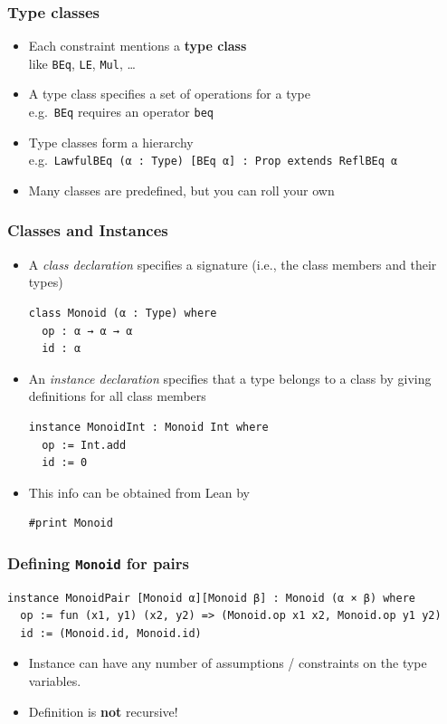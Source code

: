 \documentclass{beamer}
\begin{document}
\begin{frame}[fragile]
  \frametitle{Type classes}
  \begin{itemize}
  \item Each constraint mentions a \textbf{type class}\\
    like \texttt{BEq}, \texttt{LE}, \texttt{Mul}, \dots
  \item A type class specifies a set of operations for a type\\
    e.g.\ \texttt{BEq} requires an operator \texttt{beq}
  \item Type classes form a hierarchy\\
    e.g.\ \lstinline{LawfulBEq (α : Type) [BEq α] : Prop extends ReflBEq α}
  \item Many classes are predefined, but you can roll your own
  \end{itemize}
\end{frame}
\begin{frame}[fragile]
  \frametitle{Classes and Instances}
  \begin{itemize}
  \item A \emph{class declaration} specifies a signature (i.e., the class members and their types)
\begin{lstlisting}
class Monoid (α : Type) where
  op : α → α → α
  id : α
\end{lstlisting}
  \item An \emph{instance declaration} specifies that a type belongs to a class by giving definitions for all class members
\begin{lstlisting}
instance MonoidInt : Monoid Int where
  op := Int.add
  id := 0
\end{lstlisting}
  \item This info can be obtained from Lean by
\begin{lstlisting}
#print Monoid
\end{lstlisting}
  \end{itemize}
\end{frame}
\begin{frame}[fragile]
  \frametitle{Defining \texttt{Monoid} for pairs}
\begin{lstlisting}
instance MonoidPair [Monoid α][Monoid β] : Monoid (α × β) where
  op := fun (x1, y1) (x2, y2) => (Monoid.op x1 x2, Monoid.op y1 y2)
  id := (Monoid.id, Monoid.id)
\end{lstlisting}
  \begin{itemize}
  \item Instance can have any number of assumptions / constraints on the type
    variables.
  \item Definition is \textbf{not} recursive!
  \end{itemize}
\end{frame}
\end{document}
